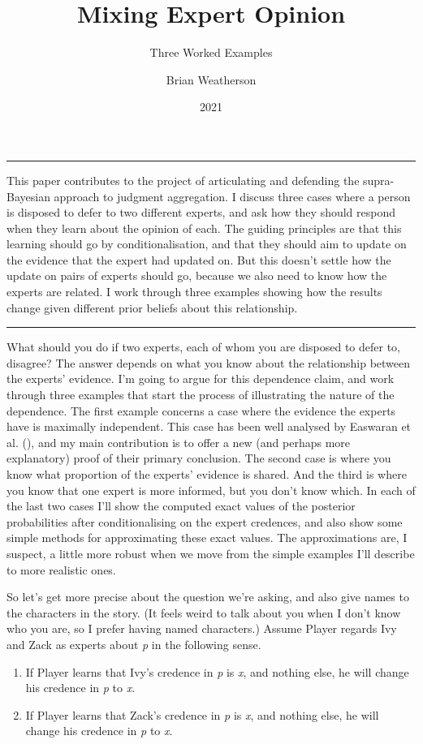 \documentclass[
  10pt,
  letterpaper,
  DIV=11,
  numbers=noendperiod,
  twoside]{scrartcl}
\title{Mixing Expert Opinion}
\subtitle{Three Worked Examples}
\author{Brian Weatherson}
\date{2021}
\renewenvironment{abstract}
 {\vspace{-1.25cm}
 \quotation\small\noindent\rule{\linewidth}{.5pt}\par\smallskip
 \noindent }
 {\par\noindent\rule{\linewidth}{.5pt}\endquotation}
\begin{document}
\maketitle
\begin{abstract}
This paper contributes to the project of articulating and defending the
supra-Bayesian approach to judgment aggregation. I discuss three cases
where a person is disposed to defer to two different experts, and ask
how they should respond when they learn about the opinion of each. The
guiding principles are that this learning should go by
conditionalisation, and that they should aim to update on the evidence
that the expert had updated on. But this doesn't settle how the update
on pairs of experts should go, because we also need to know how the
experts are related. I work through three examples showing how the
results change given different prior beliefs about this relationship.
\end{abstract}

What should you do if two experts, each of whom you are disposed to
defer to, disagree? The answer depends on what you know about the
relationship between the experts' evidence. I'm going to argue for this
dependence claim, and work through three examples that start the process
of illustrating the nature of the dependence. The first example concerns
a case where the evidence the experts have is maximally independent.
This case has been well analysed by Easwaran et al.
(), and my main contribution is to
offer a new (and perhaps more explanatory) proof of their primary
conclusion. The second case is where you know what proportion of the
experts' evidence is shared. And the third is where you know that one
expert is more informed, but you don't know which. In each of the last
two cases I'll show the computed exact values of the posterior
probabilities after conditionalising on the expert credences, and also
show some simple methods for approximating these exact values. The
approximations are, I suspect, a little more robust when we move from
the simple examples I'll describe to more realistic ones.

So let's get more precise about the question we're asking, and also give
names to the characters in the story. (It feels weird to talk about you
when I don't know who you are, so I prefer having named characters.)
Assume Player regards Ivy and Zack as experts about \emph{p} in the
following sense.

\begin{enumerate}
\def\labelenumi{(\arabic{enumi})}
\item
  If Player learns that Ivy's credence in \emph{p} is \emph{x}, and
  nothing else, he will change his credence in \emph{p} to \emph{x}.
\item
  If Player learns that Zack's credence in \emph{p} is \emph{x}, and
  nothing else, he will change his credence in \emph{p} to \emph{x}.
\end{enumerate}
\end{document}
